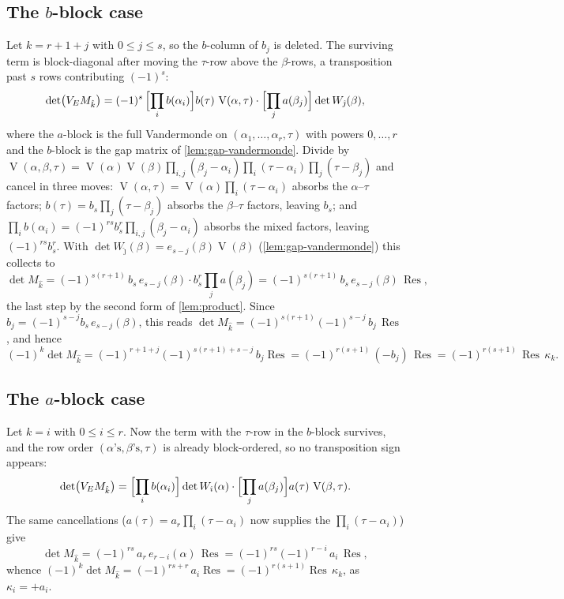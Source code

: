 \documentclass[11pt,reqno]{amsart}
\theoremstyle{definition}
\theoremstyle{remark}
\newcommand{\Res}{\operatorname{Res}}
\newcommand{\Vand}{\operatorname{V}}
\begin{document}
\subsection{The \texorpdfstring{$b$}{b}-block case}
Let $k=r+1+j$ with $0\le j\le s$, so the $b$-column of $b_j$ is
deleted.  The surviving term is block-diagonal after moving the
$\tau$-row above the $\beta$-rows, a transposition past $s$ rows
contributing $(-1)^s$:
\[
 \det\bigl(V_EM_{\hat k}\bigr)
 =(-1)^s\,
 \Bigl[\prod_ib(\alpha_i)\Bigr]b(\tau)\,\Vand(\alpha,\tau)\cdot
 \Bigl[\prod_ja(\beta_j)\Bigr]\det W_{\hat\jmath}(\beta),
\]
where the $a$-block is the full Vandermonde on
$(\alpha_1,\dots,\alpha_r,\tau)$ with powers $0,\dots,r$ and the
$b$-block is the gap matrix of \cref{lem:gap-vandermonde}.  Divide by
$\Vand(\alpha,\beta,\tau)
=\Vand(\alpha)\Vand(\beta)\prod_{i,j}(\beta_j-\alpha_i)
\prod_i(\tau-\alpha_i)\prod_j(\tau-\beta_j)$
and cancel in three moves:
$\Vand(\alpha,\tau)=\Vand(\alpha)\prod_i(\tau-\alpha_i)$ absorbs the
$\alpha$--$\tau$ factors; $b(\tau)=b_s\prod_j(\tau-\beta_j)$ absorbs
the $\beta$--$\tau$ factors, leaving $b_s$; and
$\prod_ib(\alpha_i)=(-1)^{rs}b_s^r\prod_{i,j}(\beta_j-\alpha_i)$
absorbs the mixed factors, leaving $(-1)^{rs}b_s^r$.  With
$\det W_{\hat\jmath}(\beta)=e_{s-j}(\beta)\Vand(\beta)$
(\cref{lem:gap-vandermonde}) this collects to
\[
 \det M_{\hat k}
 =(-1)^{s(r+1)}\,b_s\,e_{s-j}(\beta)\cdot
 b_s^{r}\prod_ja(\beta_j)
 =(-1)^{s(r+1)}\,b_s\,e_{s-j}(\beta)\,\Res,
\]
the last step by the second form of \cref{lem:product}.
Since $b_j=(-1)^{s-j}b_s\,e_{s-j}(\beta)$, this reads
$\det M_{\hat k}=(-1)^{s(r+1)}(-1)^{s-j}\,b_j\,\Res$, and hence
\[
 (-1)^k\det M_{\hat k}
 =(-1)^{r+1+j}(-1)^{s(r+1)+s-j}\,b_j\Res
 =(-1)^{r(s+1)}\,(-b_j)\,\Res
 =(-1)^{r(s+1)}\,\Res\,\kappa_k .
\]

\subsection{The \texorpdfstring{$a$}{a}-block case}
Let $k=i$ with $0\le i\le r$.  Now the term with the $\tau$-row in
the $b$-block survives, and the row order
$(\alpha\text{'s},\beta\text{'s},\tau)$ is already block-ordered, so
no transposition sign appears:
\[
 \det\bigl(V_EM_{\hat k}\bigr)
 =\Bigl[\prod_ib(\alpha_i)\Bigr]\det W_{\hat\imath}(\alpha)\cdot
 \Bigl[\prod_ja(\beta_j)\Bigr]a(\tau)\,\Vand(\beta,\tau).
\]
The same cancellations ($a(\tau)=a_r\prod_i(\tau-\alpha_i)$ now
supplies the $\prod_i(\tau-\alpha_i)$) give
\[
 \det M_{\hat k}
 =(-1)^{rs}\,a_r\,e_{r-i}(\alpha)\,\Res
 =(-1)^{rs}(-1)^{r-i}\,a_i\,\Res,
\]
whence
$(-1)^k\det M_{\hat k}=(-1)^{rs+r}\,a_i\Res
=(-1)^{r(s+1)}\Res\,\kappa_k$, as $\kappa_i=+a_i$.
\end{document}
